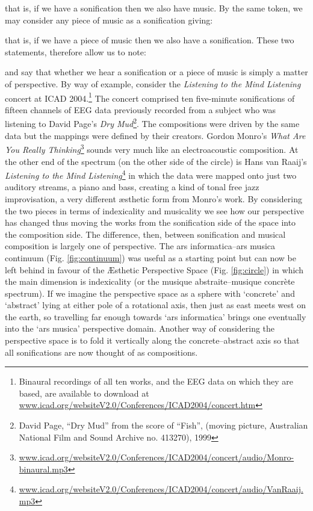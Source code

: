 \documentclass{article}
\begin{document}
that is, if we have a sonification then we also have music. By the same token, we may consider any piece of music as a sonification giving:

that is, if we have a piece of music then we also have a sonification. These two statements, therefore allow us to note:

and say that whether we hear a sonification or a piece of music is simply a matter of perspective. By way of example, consider the \textit{Listening to the Mind Listening} concert at ICAD 2004.\footnote{Binaural recordings of all ten works, and the EEG data on which they are based, are available to download at \url{www.icad.org/websiteV2.0/Conferences/ICAD2004/concert.htm}} The concert comprised ten five-minute sonifications of fifteen channels of EEG data previously recorded from a subject who was listening to David Page's \textit{Dry Mud}\footnote{David Page, ``Dry Mud'' from the score of ``Fish'', (moving picture, Australian National Film and Sound Archive no. 413270), 1999 }. The compositions were driven by the same data but the mappings were defined by their creators. Gordon Monro's \textit{What Are You Really Thinking}\footnote{\url{www.icad.org/websiteV2.0/Conferences/ICAD2004/concert/audio/Monro-binaural.mp3}} sounds very much like an electroacoustic composition. At the other end of the spectrum (on the other side of the circle) is Hans van Raaij's \textit{Listening to the Mind Listening}\footnote{\url{www.icad.org/websiteV2.0/Conferences/ICAD2004/concert/audio/VanRaaij.mp3}} in which the data were mapped onto just two auditory streams, a piano and bass, creating a kind of tonal free jazz improvisation, a very different æsthetic form from Monro's work. By considering the two pieces in terms of indexicality and musicality we see how our perspective has changed thus moving the works from the sonification side of the space into the composition side. The difference, then, between sonification and musical composition is largely one of perspective. The ars informatica--ars musica continuum (Fig. \ref{fig:continuum}) was useful as a starting point but can now be left behind in favour of the Æsthetic Perspective Space (Fig. \ref{fig:circle}) in which the main dimension is indexicality (or the musique abstraite--musique concrète spectrum). If we imagine the perspective space as a sphere with `concrete' and `abstract' lying at either pole of a rotational axis, then just as east meets west on the earth, so travelling far enough towards `ars informatica' brings one eventually into the `ars musica' perspective domain. Another way of considering the perspective space is to fold it vertically along the concrete--abstract axis so that all sonifications are now thought of as compositions.
\end{document}
